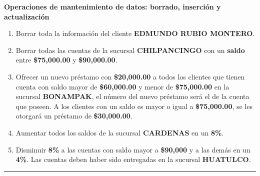 \documentclass{exam}
\begin{document}
\begin{questions}
	\textbf{Operaciones de mantenimiento de datos: borrado, inserción y actualización}
	\begin{enumerate}[label=\alph*.]
		\item Borrar toda la información del cliente \textbf{EDMUNDO RUBIO MONTERO}.
		\item Borrar todas las cuentas de la sucursal \textbf{CHILPANCINGO} con un \textbf{saldo} entre \textbf{\$75,000.00} y \textbf{\$90,000.00}.
		\item Ofrecer un nuevo préstamo con \textbf{\$20,000.00} a todos los clientes que tienen cuenta con saldo mayor de \textbf{\$60,000.00} y menor de \textbf{\$75,000.00} en la sucursal \textbf{BONAMPAK}, el número del nuevo préstamo será el de la cuenta que poseen. A los clientes con un saldo es mayor o igual a \textbf{\$75,000.00}, se les otorgará un préstamo de \textbf{\$30,000.00}.
		\item Aumentar todos los saldos de la sucursal \textbf{CARDENAS} en un \textbf{8\%}.
		\item Disminuir \textbf{8\%} a las cuentas con saldo mayor a \textbf{\$90,000} y a las demás en un \textbf{4\%}. Las cuentas deben haber sido
entregadas en la sucursal \textbf{HUATULCO}.
	\end{enumerate}
	
\end{questions}

\noindent
\rule[2ex]{\textwidth}{2pt}
\end{document}
